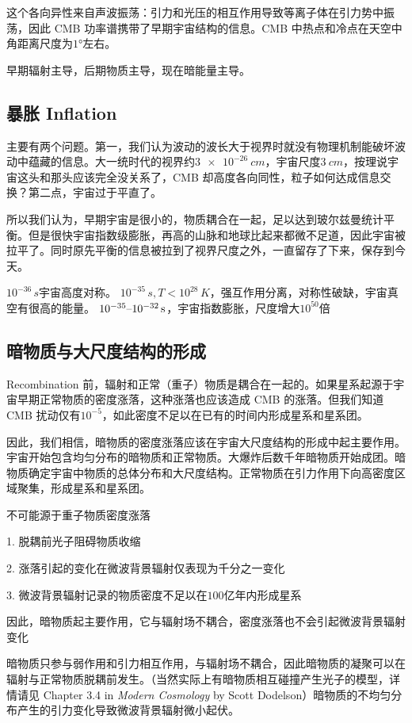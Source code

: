 \documentclass[../天体物理基础.tex]{subfiles}
\begin{document}
这个各向异性来自声波振荡：引力和光压的相互作用导致等离子体在引力势中振荡，因此 CMB 功率谱携带了早期宇宙结构的信息。CMB 中热点和冷点在天空中角距离尺度为$\ang{1;;}$左右。

早期辐射主导，后期物质主导，现在暗能量主导。



\subsection{暴胀 Inflation}
主要有两个问题。第一，我们认为波动的波长大于视界时就没有物理机制能破坏波动中蕴藏的信息。大一统时代的视界约$\qty{3e-26}{cm}$，宇宙尺度$\qty{3}{cm}$，按理说宇宙这头和那头应该完全没关系了，CMB 却高度各向同性，粒子如何达成信息交换？第二点，宇宙过于平直了。

所以我们认为，早期宇宙是很小的，物质耦合在一起，足以达到玻尔兹曼统计平衡。但是很快宇宙指数级膨胀，再高的山脉和地球比起来都微不足道，因此宇宙被拉平了。同时原先平衡的信息被拉到了视界尺度之外，一直留存了下来，保存到今天。

$10^{-36}\,\unit{s}$宇宙高度对称。
$10^{-35}\,\unit{s},T<10^{28}\,\unit{K}$，强互作用分离，对称性破缺，宇宙真空有很高的能量。
$10^{-35}\text{\textendash}10^{-32}\,\unit{s}$，宇宙指数膨胀，尺度增大$10^{50}$倍

\subsection{暗物质与大尺度结构的形成}
Recombination 前，辐射和正常（重子）物质是耦合在一起的。如果星系起源于宇宙早期正常物质的密度涨落，这种涨落也应该造成 CMB 的涨落。但我们知道 CMB 扰动仅有$10^{-5}$，如此密度不足以在已有的时间内形成星系和星系团。

因此，我们相信，暗物质的密度涨落应该在宇宙大尺度结构的形成中起主要作用。宇宙开始包含均匀分布的暗物质和正常物质。大爆炸后数千年暗物质开始成团。暗物质确定宇宙中物质的总体分布和大尺度结构。正常物质在引力作用下向高密度区域聚集，形成星系和星系团。

不可能源于重子物质密度涨落

1. 脱耦前光子阻碍物质收缩

2. 涨落引起的变化在微波背景辐射仅表现为千分之一变化

3. 微波背景辐射记录的物质密度不足以在$100$亿年内形成星系

因此，暗物质起主要作用，它与辐射场不耦合，密度涨落也不会引起微波背景辐射变化


暗物质只参与弱作用和引力相互作用，与辐射场不耦合，因此暗物质的凝聚可以在辐射与正常物质脱耦前发生。（当然实际上有暗物质相互碰撞产生光子的模型，详情请见 Chapter 3.4 in \textit{Modern Cosmology} by Scott Dodelson）暗物质的不均匀分布产生的引力变化导致微波背景辐射微小起伏。
\end{document}
